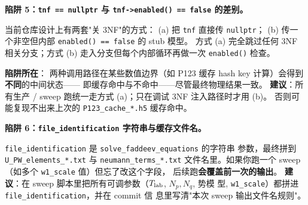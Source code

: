 \begin{pitfallbox}
\textbf{陷阱 5：\texttt{tnf == nullptr} 与 \texttt{tnf->enabled() == false} 的差别。}

当前仓库设计上有两套"关 3NF"的方式：
(a) 把 \texttt{tnf} 直接传 \texttt{nullptr}；
(b) 传一个非空但内部 \texttt{enabled() == false} 的 stub 模型。
方式 (a) 完全跳过任何 3NF 相关分支；方式 (b) 走入分支但每个内部循环再做一次 \texttt{enabled()} 检查。

\textbf{陷阱所在}：
两种调用路径在某些数值边界（如 P123 缓存 hash key 计算）会得到\textbf{不同}的中间状态——
即缓存命中与不命中——尽管最终物理结果一致。
\textbf{建议}：所有生产 / sweep 跑统一走方式 (a)；只在调试 3NF 注入路径时才用 (b)。
否则可能复现不出来上次的 \texttt{P123\_cache\_*.h5} 缓存命中。
\end{pitfallbox}

\begin{pitfallbox}
\textbf{陷阱 6：\texttt{file\_identification} 字符串与缓存文件名。}

\texttt{file\_identification} 是 \texttt{solve\_faddeev\_equations} 的字符串
参数，最终拼到 \texttt{U\_PW\_elements\_*.txt} 与 \texttt{neumann\_terms\_*.txt}
文件名里。如果你跑一个 sweep（如多个 \texttt{w1\_scale} 值）但忘了改这个字段，
后续跑\textbf{会覆盖前一次的输出}。
\textbf{建议}：在 sweep 脚本里把所有可调参数（\({T_{\text{lab}}}\), \(N_p, N_q\), 势模
型, \texttt{w1\_scale}）都拼进 \texttt{file\_identification}，并在 commit 信
息里写清"本次 sweep 输出文件名规则"。
\end{pitfallbox}
